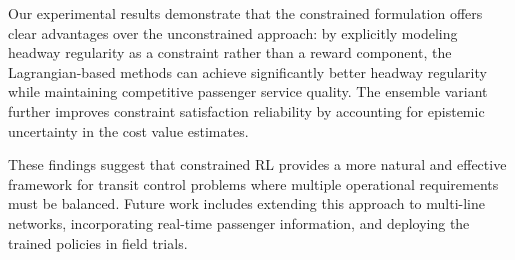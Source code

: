 \documentclass[10pt]{article}
\begin{document}
Our experimental results demonstrate that the constrained formulation offers clear advantages over the unconstrained approach: by explicitly modeling headway regularity as a constraint rather than a reward component, the Lagrangian-based methods can achieve significantly better headway regularity while maintaining competitive passenger service quality. The ensemble variant further improves constraint satisfaction reliability by accounting for epistemic uncertainty in the cost value estimates.

These findings suggest that constrained RL provides a more natural and effective framework for transit control problems where multiple operational requirements must be balanced. Future work includes extending this approach to multi-line networks, incorporating real-time passenger information, and deploying the trained policies in field trials.




\end{document}
